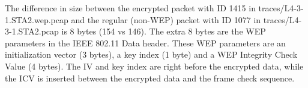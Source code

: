 The difference in size between the encrypted packet with ID 1415 in traces/L4-3-1.STA2.wep.pcap and the regular (non-WEP) packet with ID 1077 in traces/L4-3-1.STA2.pcap is 8 bytes (154 vs 146).
The extra 8 bytes are the WEP parameters in the IEEE 802.11 Data header. These WEP parameters are an initialization vector (3 bytes), a key index (1 byte) and a WEP Integrity Check Value (4 bytes). The IV and key index are right before the encrypted data, while the ICV is inserted between the encrypted data and the frame check sequence.
